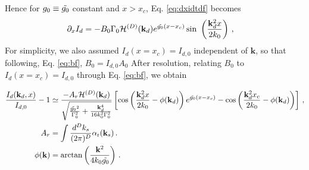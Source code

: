 \documentclass[
 reprint,
 amsmath,amssymb,
 aps,
]{revtex4-1}
\begin{document}
Hence for $g_0\equiv \Tilde{g_0}$ constant and $x>x_c$, Eq. \eqref{eq:dxidtdf} becomes
\begin{align}
   \partial_x I_d&=-B_0\Gamma_0 \mathcal{H}^{(D)}(\mathbf{k}_d)e^{  \Tilde{g_0}(x-x_c)} 
    \sin\ \left(\frac{\mathbf{k}_d^2x }{2k_0}  \right)   \, , \label{eq:idtd1} 
\end{align}
For simplicity, we also assumed $I_d(x=x_c)=I_{d,0}$ independent of $\mathbf{k}$, so that following, Eq. \eqref{eq:bf}, $B_0 = I_{d,0}A_0$
After resolution, relating  $B_0$ to $I_d(x=x_c)=I_{d,0}$ through Eq. \eqref{eq:bf}, we obtain
\begin{widetext}
\begin{align}
    \frac{I_d(\mathbf{k}_d,x)}{I_{d,0}}-1& \simeq
   \frac{
   -A_r  \mathcal{H}^{(D)}(\mathbf{k}_d)
   }{
   \sqrt{\frac{\Tilde{g_0}^2}{\Gamma_0^2}  +\frac{\mathbf{k}_d^4 }{16k_0^2 \Gamma_0^2}}
    } 
    \left[
    \cos\left( \frac{\mathbf{k}_d^2x }{2k_0}  -\phi(\mathbf{k}_d) \right) 
   e^{\Tilde{g_0}(x-x_c)}
   -\cos\left( \frac{\mathbf{k}_d^2x_c }{2k_0}  -\phi(\mathbf{k}_d) \right) 
    \right]
    \, , \label{eq:idf} \\
    A_r &= \int \frac{d^Dk_s}{(2\pi)^D}    \alpha_\mathrm{r}(\mathbf{k}_s) \, .\label{eq:ar}\\
    \phi(\mathbf{k}) &= \arctan \left(  \frac{\mathbf{k}^2}{4k_0\Tilde{g_0}}\right)\, . \label{eq:phi}
\end{align}
\end{widetext}
\end{document}
